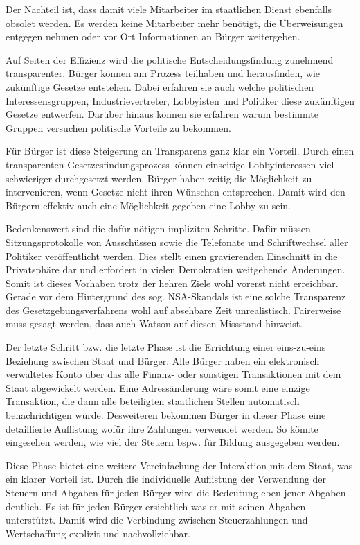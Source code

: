 \documentclass[12pt,twoside,ngerman]{scrartcl}
\theoremstyle{plain}
\theoremstyle{definition}
\theoremstyle{remark}
\begin{document}
	Der Nachteil ist, dass damit viele Mitarbeiter im staatlichen Dienst ebenfalls obsolet werden. Es werden keine Mitarbeiter mehr benötigt, die Überweisungen entgegen nehmen oder vor Ort Informationen an Bürger weitergeben.
	
	Auf Seiten der Effizienz wird die politische Entscheidungsfindung zunehmend transparenter. Bürger können am Prozess teilhaben und herausfinden, wie zukünftige Gesetze entstehen. Dabei erfahren sie auch welche politischen Interessensgruppen, Industrievertreter, Lobbyisten und Politiker diese zukünftigen Gesetze entwerfen. Darüber hinaus können sie erfahren warum bestimmte Gruppen versuchen politische Vorteile zu bekommen.
	
	Für Bürger ist diese Steigerung an Transparenz ganz klar ein Vorteil. Durch einen transparenten Gesetzesfindungsprozess können einseitige Lobbyinteressen viel schwieriger durchgesetzt werden. Bürger haben zeitig die Möglichkeit zu intervenieren, wenn Gesetze nicht ihren Wünschen entsprechen. Damit wird den Bürgern effektiv auch eine Möglichkeit gegeben eine Lobby zu sein.
	
	Bedenkenswert sind die dafür nötigen impliziten Schritte. Dafür müssen Sitzungsprotokolle von Ausschüssen sowie die Telefonate und Schriftwechsel aller Politiker veröffentlicht werden. Dies stellt einen gravierenden Einschnitt in die Privatsphäre dar und erfordert in vielen Demokratien weitgehende Änderungen. Somit ist dieses Vorhaben trotz der hehren Ziele wohl vorerst nicht erreichbar. Gerade vor dem Hintergrund des sog. NSA-Skandals ist eine solche Transparenz des Gesetzgebungsverfahrens wohl auf absehbare Zeit unrealistisch.
	Fairerweise muss gesagt werden, dass auch Watson auf diesen Missstand hinweist.
	
	Der letzte Schritt bzw. die letzte Phase ist die Errichtung einer eins-zu-eins Beziehung zwischen Staat und Bürger. Alle Bürger haben ein elektronisch verwaltetes Konto über das alle Finanz- oder sonstigen Transaktionen mit dem Staat abgewickelt werden. Eine Adressänderung wäre somit eine einzige Transaktion, die dann alle beteiligten staatlichen Stellen automatisch benachrichtigen würde.
	Desweiteren bekommen Bürger in dieser Phase eine detaillierte Auflistung wofür ihre Zahlungen verwendet werden. So könnte eingesehen werden, wie viel der Steuern bspw. für Bildung ausgegeben werden.
	
	Diese Phase bietet eine weitere Vereinfachung der Interaktion mit dem Staat, was ein klarer Vorteil ist. Durch die individuelle Auflistung der Verwendung der Steuern und Abgaben für jeden Bürger wird die Bedeutung eben jener Abgaben deutlich. Es ist für jeden Bürger ersichtlich was er mit seinen Abgaben unterstützt. Damit wird die Verbindung zwischen Steuerzahlungen und Wertschaffung explizit und nachvollziehbar.
	
\end{document}
